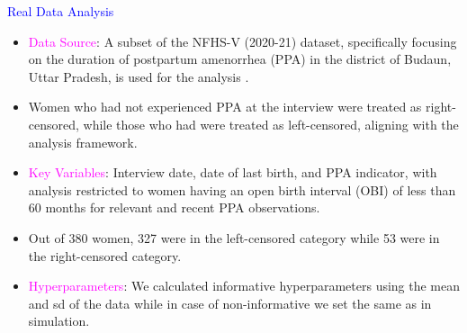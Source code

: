 \documentclass[final]{beamer}
\newlength{\colwidth}
\begin{document}
\begin{frame}[t]
\begin{columns}[t]
\begin{column}{\colwidth}
  \begin{block}{\textcolor{blue}{Real Data Analysis}}
  \begin{itemize}
      \item \textcolor{magenta}{Data Source}: A subset of the NFHS-V (2020-21) dataset, specifically focusing on the duration of postpartum amenorrhea (PPA) in the district of Budaun, Uttar Pradesh, is used for the analysis \cite{nfhs5}. 
      \vspace{0.8mm}
      \item Women who had not experienced PPA at the interview were treated as right-censored, while those who had were treated as left-censored, aligning with the analysis framework. 
      \vspace{0.8mm}
      \item \textcolor{magenta}{Key Variables}: Interview date, date of last birth, and PPA indicator, with analysis restricted to women having an open birth interval (OBI) of less than 60 months for relevant and recent PPA observations.
      \vspace{0.8mm}
      \item Out of 380 women, 327 were in the left-censored category while 53 were in the right-censored category.
      \vspace{0.8mm}
      \item \textcolor{magenta}{Hyperparameters}: We calculated informative hyperparameters using the mean and sd of the data while in case of non-informative we set the same as in simulation.  
  \end{itemize}


\end{block}
\end{column}
\end{columns}
\end{frame}
\end{document}
